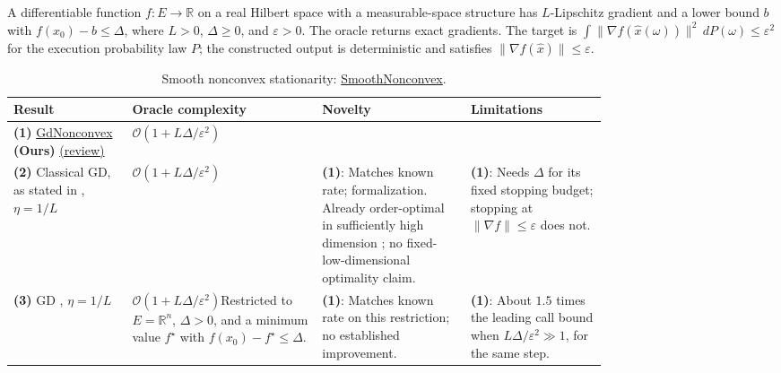\begin{table}[tp]
\centering
\caption{Smooth nonconvex stationarity: \href{https://github.com/k3nfalt/longtails/blob/main/LongTails/Setups/SmoothNonconvex.lean}{SmoothNonconvex}.}\label{tab:SmoothNonconvex}
\parbox{\linewidth}{\footnotesize A differentiable function $f:E\to\mathbb R$ on a real Hilbert space with a measurable-space structure has $L$-Lipschitz gradient and a lower bound $b$ with $f(x_0)-b\le\Delta$, where $L>0$, $\Delta\ge0$, and $\varepsilon>0$. The oracle returns exact gradients. The target is $\int\|\nabla f(\widehat x(\omega))\|^2\,dP(\omega)\le\varepsilon^2$ for the execution probability law $P$; the constructed output is deterministic and satisfies $\|\nabla f(\widehat x)\|\le\varepsilon$.}\par\smallskip
\begin{threeparttable}
\footnotesize
\setlength{\tabcolsep}{4pt}\renewcommand{\arraystretch}{1.25}
\begin{tabularx}{\linewidth}{@{}>{\raggedright\arraybackslash}p{0.20\linewidth}>{\raggedright\arraybackslash}p{0.32\linewidth}>{\raggedright\arraybackslash}p{0.25\linewidth}>{\raggedright\arraybackslash}X@{}}
\toprule
\textbf{Result} & \textbf{Oracle complexity} & \textbf{Novelty} & \textbf{Limitations} \\
\midrule
\textbf{(1)} \href{https://github.com/k3nfalt/longtails/blob/main/LongTails/Theorems/GdNonconvex.lean}{Gd\allowbreak Nonconvex} \textbf{(Ours)} \href{https://github.com/k3nfalt/longtails/blob/main/scripts/reviews/GdNonconvex.md}{(review)} & $\mathcal{O}(1+L\Delta/\varepsilon^2)$ & & \\
\midrule[1.2pt]
\textbf{(2)} Classical GD, as stated in \citep[\S1]{snADKZ2022}, $\eta=1/L$ & $\mathcal{O}(1+L\Delta/\varepsilon^2)$ & \textbf{(1)}: Matches known rate; formalization. Already order-optimal in sufficiently high dimension \citep[Thms.~1--2, $p=1$]{snCDHS2019v3}; no fixed-low-dimensional optimality claim. & \textbf{(1)}: Needs $\Delta$ for its fixed stopping budget; stopping at $\|\nabla f\|\le\varepsilon$ does not. \\
\midrule
\textbf{(3)} GD \citep[Thm.~2, Eq.~(16)]{snADKZ2022}, $\eta=1/L$ & $\mathcal{O}(1+L\Delta/\varepsilon^2)$\newline Restricted to $E=\mathbb R^n$, $\Delta>0$, and a minimum value $f^\star$ with $f(x_0)-f^\star\le\Delta$. & \textbf{(1)}: Matches known rate on this restriction; no established improvement. & \textbf{(1)}: About $1.5$ times the leading call bound when $L\Delta/\varepsilon^2\gg1$, for the same step. \\

\end{tabularx}
\end{threeparttable}
\end{table}
